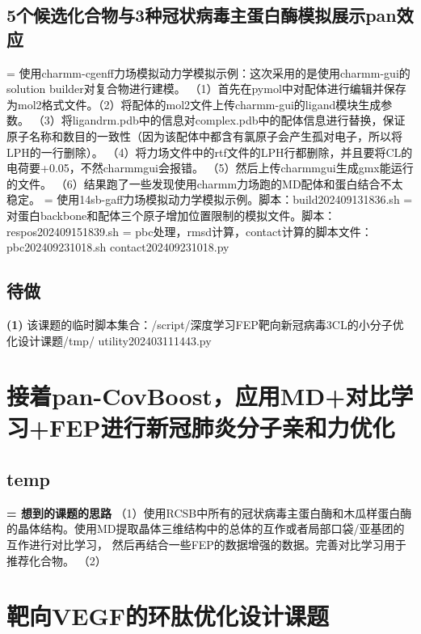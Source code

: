 \subsection{5个候选化合物与3种冠状病毒主蛋白酶模拟展示pan效应}
\noindent = 使用charmm-cgenff力场模拟动力学模拟示例：这次采用的是使用charmm-gui的solution builder对复合物进行建模。
（1）首先在pymol中对配体进行编辑并保存为mol2格式文件。（2）将配体的mol2文件上传charmm-gui的ligand模块生成参数。
（3）将ligandrm.pdb中的信息对complex.pdb中的配体信息进行替换，保证原子名称和数目的一致性（因为该配体中都含有氯原子会产生孤对电子，所以将LPH的一行删除）。
（4）将力场文件中的rtf文件的LPH行都删除，并且要将CL的电荷要+0.05，不然charmmgui会报错。
（5）然后上传charmmgui生成gmx能运行的文件。
（6）结果跑了一些发现使用charmm力场跑的MD配体和蛋白结合不太稳定。
\newline = 使用14sb-gaff力场模拟动力学模拟示例。脚本：build202409131836.sh
\newline = 对蛋白backbone和配体三个原子增加位置限制的模拟文件。脚本：respos202409151839.sh
\newline = pbc处理，rmsd计算，contact计算的脚本文件：pbc202409231018.sh   contact202409231018.py
\subsection{待做}
\noindent\textbf{(1)} 该课题的临时脚本集合：/script/深度学习FEP靶向新冠病毒3CL的小分子优化设计课题/tmp/ utility202403111443.py
\section{接着pan-CovBoost，应用MD+对比学习+FEP进行新冠肺炎分子亲和力优化}
\subsection{temp}
\noindent \textbf{= 想到的课题的思路}
\newline（1）使用RCSB中所有的冠状病毒主蛋白酶和木瓜样蛋白酶的晶体结构。使用MD提取晶体三维结构中的总体的互作或者局部口袋/亚基团的互作进行对比学习，
然后再结合一些FEP的数据增强的数据。完善对比学习用于推荐化合物。
\newline（2）
\section{靶向VEGF的环肽优化设计课题}

